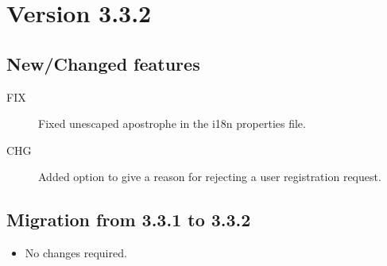 \section{Version 3.3.2}
\label{sec:3.3.2}

\subsection{New/Changed features}
\begin{description}
	\item[FIX]  Fixed unescaped apostrophe in the i18n properties file.
	\item[CHG] Added option to give a reason for rejecting a user registration request.
\end{description}

\subsection{Migration from 3.3.1 to 3.3.2}
\begin{itemize}
	\item No changes required.
\end{itemize}